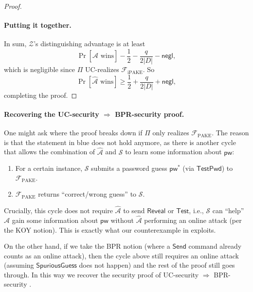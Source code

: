 \documentclass{article}
\newcommand{\negl}{\mathsf{negl}}
\newcommand{\adv}{\mathcal{A}}
\newcommand{\env}{\mathcal{Z}}
\renewcommand{\sim}{\mathcal{S}}
\newcommand{\func}{\mathcal{F}}
\newcommand{\Fpake}{\func_\mathrm{PAKE}}
\newcommand{\Fipake}{\func_\mathrm{iPAKE}}
\newcommand{\pw}{\mathsf{pw}}
\newcommand{\TestPwd}{\mathsf{TestPwd}}
\newcommand{\Send}{\mathsf{Send}}
\newcommand{\Reveal}{\mathsf{Reveal}}
\newcommand{\Test}{\mathsf{Test}}
\newcommand{\SpuriousGuess}{\mathsf{SpuriousGuess}}
\begin{document}
\begin{proof}
\paragraph{Putting it together.}
In sum, $\env$'s distinguishing advantage is at least
\[
\Pr[\widehat{\adv}\text{ wins}] - \frac{1}{2} - \frac{q}{2|D|} - \negl,
\]
which is negligible since $\Pi$ UC-realizes $\Fipake$. So
\[
\Pr[\widehat{\adv}\text{ wins}] \geq \frac{1}{2} + \frac{q}{2|D|} + \negl,
\]
completing the proof.
\end{proof}
\paragraph{Recovering the UC-security $\Rightarrow$ BPR-security proof.} One might ask where the proof breaks down if $\Pi$ only realizes $\Fpake$. The reason is that the statement in blue does not hold anymore, as there is another cycle that allows the combination of $\widehat{\adv}$ and $\sim$ to learn some information about $\pw$:
\begin{enumerate}
  \item For a certain instance, $\sim$ submits a password guess $\pw^*$ (via $\TestPwd$) to $\Fpake$.
  \item $\Fpake$ returns ``correct/wrong guess'' to $\sim$.
\end{enumerate}
Crucially, this cycle does not require $\widehat{\adv}$ to send $\Reveal$ or $\Test$, i.e., $\sim$ can ``help'' $\widehat{\adv}$ gain some information about $\pw$ without $\widehat{\adv}$ performing an online attack (per the KOY notion). This is exactly what our counterexample in  exploits.

On the other hand, if we take the BPR notion (where a $\Send$ command already counts as an online attack), then the cycle above still requires an online attack (assuming $\SpuriousGuess$ does not happen) and the rest of the proof still goes through. In this way we recover the security proof of UC-security $\Rightarrow$ BPR-security \cite{EC:CHKLM05}.
\end{document}
